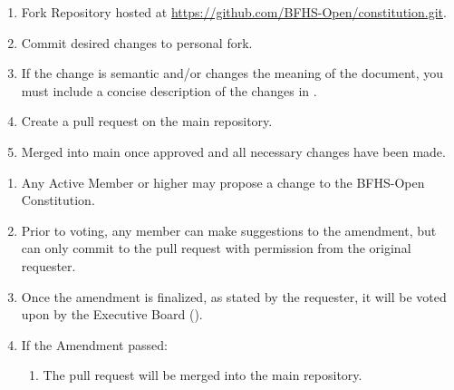 
\begin{enumerate}
	\item Fork Repository hosted at \href{https://github.com/BFHS-Open/constitution.git}{https://github.com/BFHS-Open/constitution.git}.

	\item Commit desired changes to personal fork.

	\item If the change is semantic and/or changes the meaning of the document,
		you must include a concise description of the changes in .

	\item Create a pull request on the main repository.

	\item Merged into main once approved and all necessary changes have been made.
\end{enumerate}

\begin{enumerate}
	\item Any Active Member or higher may propose a change to the BFHS-Open Constitution.

	\item Prior to voting, any member can make suggestions to the amendment, but can
		only commit to the pull request with permission from the original requester.

	\item Once the amendment is finalized, as stated by the requester, it will be voted
		upon by the Executive Board ().

	\item If the Amendment passed:
		\begin{enumerate}
			\item The pull request will be merged into the main repository.
		\end{enumerate}
\end{enumerate}